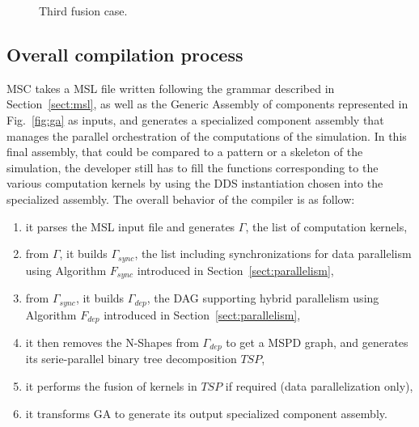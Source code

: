 \begin{figure}[h!]
\begin{center}
\caption{Third fusion case.}
\label{fig:fus3}
\end{center}
\end{figure}

\subsection{Overall compilation process}
\label{sect:ovcompil}

MSC takes a MSL file written following the grammar described in Section~\ref{sect:msl}, as well as the Generic Assembly of components represented in Fig.~\ref{fig:ga} as inputs, and generates a specialized component assembly that manages the parallel orchestration of the computations of the simulation. In this final assembly, that could be compared to a pattern or a skeleton of the simulation, the developer still has to fill the functions corresponding to the various computation kernels by using the DDS instantiation chosen into the specialized assembly.
The overall behavior of the compiler is as follow: %
\begin{enumerate}
 \item it parses the MSL input file and generates $\Gamma$, the list of computation kernels,
 \item from $\Gamma$, it builds $\Gamma_{sync}$, the list including synchronizations for data parallelism using Algorithm $F_{sync}$ introduced in Section~\ref{sect:parallelism},
 \item from $\Gamma_{sync}$, it builds $\Gamma_{dep}$, the DAG supporting hybrid parallelism using Algorithm $F_{dep}$ introduced in Section~\ref{sect:parallelism},
 \item it then removes the N-Shapes from $\Gamma_{dep}$ to get a MSPD graph, and generates its serie-parallel binary tree decomposition $TSP$,
 \item it performs the fusion of kernels in $TSP$ if required (data parallelization only),
 \item it transforms GA to generate its output specialized component assembly.
\end{enumerate}


